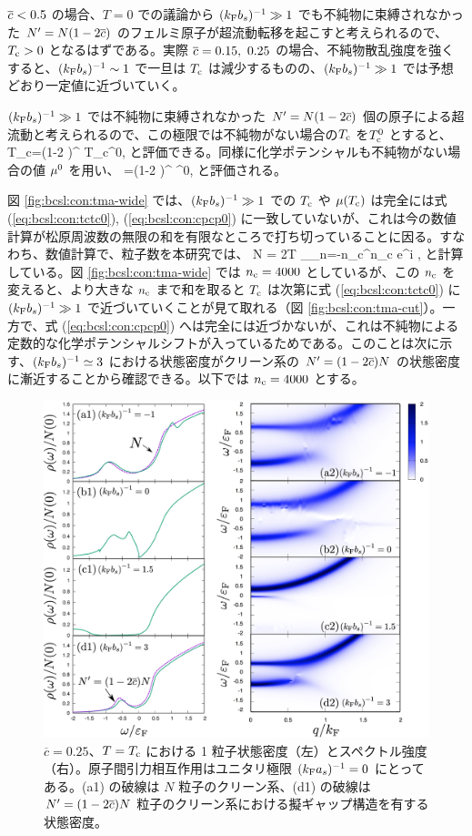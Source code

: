 $\overline{c} <0.5$ の場合、$T=0$ での議論から $(k_{\text{F}} b_s)^{-1} \gg 1$ でも不純物に束縛されなかった $N'=N(1-2\overline{c})$ のフェルミ原子が超流動転移を起こすと考えられるので、$T_{\text{c}}>0$ となるはずである。実際 $\overline{c}=0.15,\ 0.25$ の場合、不純物散乱強度を強くすると、$(k_{\text{F}} b_s)^{-1}\sim1$ で一旦は $T_{\text{c}}$ は減少するものの、$(k_{\text{F}} b_s)^{-1}\gg1$ では予想どおり一定値に近づいていく。

$(k_{\text{F}} b_s)^{-1} \gg 1 $ では不純物に束縛されなかった $N'=N(1-2\overline{c})$ 個の原子による超流動と考えられるので、この極限では不純物がない場合の$T_{\text{c}}$ を$T_{\text{c}}^{0}$ とすると、
\beq
T_c=\left(1-2 \lc\right)^{} T_c^0,\label{eq:bcsl:con:tctc0}
\eeq
と評価できる。同様に化学ポテンシャルも不純物がない場合の値 $\mu^0$ を用い、
\beq
\cpt=\left(1-2 \lc\right)^{} \cpt^0,\label{eq:bcsl:con:cpcp0}
\eeq
と評価される。


図 \ref{fig:bcsl:con:tma-wide} では、$(k_{\text{F}} b_s)^{-1}\gg1$ での $T_{\text{c}}$ や $\mu(T_{\text{c}})$ は完全には式 (\ref{eq:bcsl:con:tctc0}), (\ref{eq:bcsl:con:cpcp0}) に一致していないが、これは今の数値計算が松原周波数の無限の和を有限なところで打ち切っていることに因る。すなわち、数値計算で、粒子数を本研究では、
\beq
N = 2T \sum_{\bp}\sum_{n=-n_{\rm c}}^{n_{\rm c}} \gpom e^{i \omn \delta},
\eeq
と計算している。図 \ref{fig:bcsl:con:tma-wide} では $n_{\rm c}=4000$ としているが、この $n_{\rm c}$ を変えると、より大きな $n_{\rm c}$ まで和を取ると $T_{\text{c}}$ は次第に式 (\ref{eq:bcsl:con:tctc0}) に $(k_{\text{F}} b_s)^{-1}\gg1$ で近づいていくことが見て取れる（図 \ref{fig:bcsl:con:tma-cut}）。一方で、式 (\ref{eq:bcsl:con:cpcp0}) へは完全には近づかないが、これは不純物による定数的な化学ポテンシャルシフトが入っているためである。このことは次に示す、$(k_{\text{F}} b_s)^{-1} \simeq 3$ における状態密度がクリーン系の $N'=(1-2\overline{c})N$ の状態密度に漸近することから確認できる。以下では $n_{\rm c}=4000$ とする。

\begin{figure}[t]
\centering
\includegraphics[width=130mm]{eps/tma-c0250-spe.eps}
\caption{$\overline{c}=0.25$、$T=T_{\text{c}}$ における 1 粒子状態密度（左）とスペクトル強度（右）。原子間引力相互作用はユニタリ極限 $(k_{\text{F}} a_s)^{-1}=0$ にとってある。(a1) の破線は $N$ 粒子のクリーン系、(d1) の破線は $N'=(1-2\overline{c})N$ 粒子のクリーン系における擬ギャップ構造を有する状態密度。}
\label{fig:bcsl:imp:psgap}
\end{figure}

